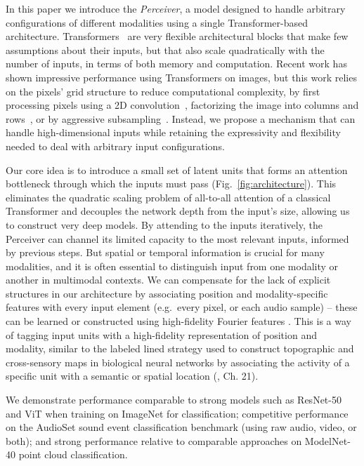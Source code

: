 In this paper we introduce the \textit{Perceiver}, a model designed to handle arbitrary configurations of different modalities using a single Transformer-based architecture. Transformers~\cite{vaswani2017attention} are very flexible architectural blocks that make few assumptions about their inputs, but that also scale quadratically with the number of inputs, in terms of both memory and computation. Recent work has shown impressive performance using Transformers on images, but this work relies on the pixels' grid structure to reduce computational complexity, by first processing pixels using a 2D convolution~\cite{dosovitskiy2020image,touvron2020training}, factorizing the image into columns and rows~\cite{ho2019axial, child2019generating}, or by aggressive subsampling~\cite{chen2020generative}. Instead, we propose a mechanism that can handle high-dimensional inputs while retaining the expressivity and flexibility needed to deal with arbitrary input configurations.

Our core idea is to introduce a small set of latent units that forms an attention bottleneck through which the inputs must pass (Fig.~\ref{fig:architecture}). This eliminates the quadratic scaling problem of all-to-all attention of a classical Transformer and decouples the network depth from the input's size, allowing us to construct very deep models. By attending to the inputs iteratively, the Perceiver can channel its limited capacity to the most relevant inputs, informed by previous steps. But spatial or temporal information is crucial for many modalities, and it is often essential to distinguish input from one modality or another in multimodal contexts. We can compensate for the lack of explicit structures in our architecture by associating position and modality-specific features with every input element (e.g.\ every pixel, or each audio sample) -- these can be learned or constructed using high-fidelity Fourier features \cite{mildenhall2020nerf, tancik2020fourier, vaswani2017attention}. This is a way of tagging input units with a high-fidelity representation of position and modality, similar to the labeled lined strategy used to construct topographic and cross-sensory maps in biological neural networks by associating the activity of a specific unit with a semantic or spatial location (\citealt{kandel2012principles}, Ch. 21).

We demonstrate performance comparable to strong models such as ResNet-50 and ViT when training on ImageNet for classification; competitive performance on the AudioSet sound event classification benchmark (using raw audio, video, or both); and strong performance relative to comparable approaches on ModelNet-40 point cloud classification. 

